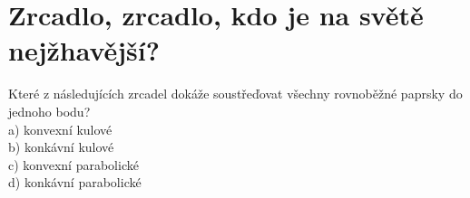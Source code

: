 \documentclass[crop=false]{standalone}
\begin{document}
\section*{Zrcadlo, zrcadlo, kdo je na světě nejžhavější?}

Které z následujících zrcadel dokáže soustřeďovat všechny rovnoběžné paprsky do jednoho bodu?
\\

a) konvexní kulové
\\

b) konkávní kulové
\\

c) konvexní parabolické
\\

d) konkávní parabolické
\end{document}
